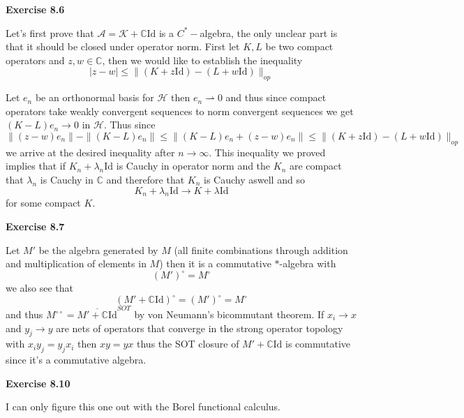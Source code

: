 \documentclass{article}
\begin{document}
\vspace{0.5cm}

\textbf{Exercise 8.6}

\vspace{0.5cm}

Let's first prove that $\mathcal A = \mathcal K + \mathbb C \text{Id}$ is a $C^*-$algebra, the only unclear part is that it should be closed under operator norm. First let $K,L$ be two compact operators and $z,w \in \mathbb C$, then we would like to establish the inequality 
$$|z-w| \leq \|(K + z \text{Id}) - (L+w\text{Id})\|_{op}$$

Let $e_n$ be an orthonormal basis for $\mathcal H$ then $e_n \rightharpoonup0$ and thus since compact operators take weakly convergent sequences to norm convergent sequences we get $(K-L)e_n \rightarrow 0$ in $\mathcal H$. Thus since
$$\|(z-w)e_n\| - \|(K-L)e_n \| \leq \|(K-L)e_n + (z-w)e_n \| \leq \|(K + z \text{Id}) - (L+w\text{Id})\|_{op}$$
we arrive at the desired inequality after $n \rightarrow \infty$. This inequality we proved implies that if $K_n + \lambda_n \text{Id}$ is Cauchy in operator norm and the $K_n$ are compact that $\lambda_n$ is Cauchy in $\mathbb C$ and therefore that $K_n$ is Cauchy aswell and so 
$$K_n + \lambda_n \text{Id} \rightarrow K + \lambda \text{Id}$$ 
for some compact $K$.

\vspace{0.5cm}

\textbf{Exercise 8.7}

\vspace{0.5cm}

Let $M'$ be the algebra generated by $M$ (all finite combinations through addition and multiplication of elements in $M$) then it is a commutative $*$-algebra with 
$$(M')^\circ = M^\circ$$
we also see that 
$$(M' + \mathbb C \text{Id})^\circ = (M')^\circ = M^\circ$$ 
and thus $M^{\circ \circ} = \overline{M' + \mathbb C \text{Id}}^{SOT}$ by von Neumann's bicommutant theorem. If $x_i \rightarrow x$ and $y_j \rightarrow y$ are nets of operators that converge in the strong operator topology with $x_iy_j = y_j x_i$ then $xy = yx$ thus the SOT closure of $M' + \mathbb C \text{Id}$ is commutative since it's a commutative algebra.

\vspace{0.5cm}

\textbf{Exercise 8.10}

\vspace{0.5cm}

I can only figure this one out with the Borel functional calculus. 
\end{document}
